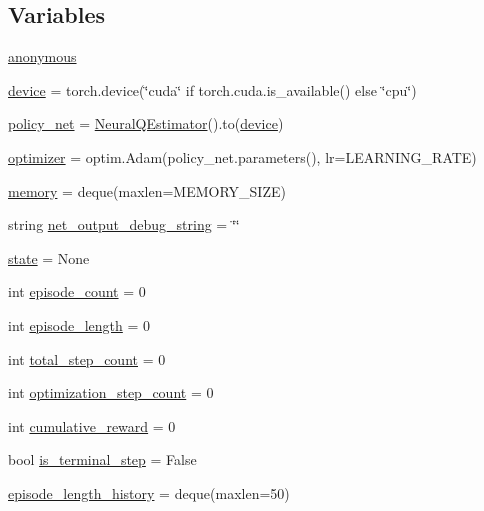 \subsection*{Variables}
\begin{DoxyCompactItemize}
\item 
\hyperlink{namespacelearn_a876436d14202fc09e5ca40af082209ca}{anonymous}
\item 
\hyperlink{namespacelearn_ae55deaa379fcb61fd26a801452c29737}{device} = torch.\+device(\char`\"{}cuda\char`\"{} if torch.\+cuda.\+is\+\_\+available() else \char`\"{}cpu\char`\"{})
\item 
\hyperlink{namespacelearn_aff1270198d684f1b88420d8ecbf660f0}{policy\+\_\+net} = \hyperlink{classparameters_1_1_neural_q_estimator}{Neural\+Q\+Estimator}().to(\hyperlink{namespacelearn_ae55deaa379fcb61fd26a801452c29737}{device})
\item 
\hyperlink{namespacelearn_ac338ecc10d74abd2f4882f19a6305c67}{optimizer} = optim.\+Adam(policy\+\_\+net.\+parameters(), lr=L\+E\+A\+R\+N\+I\+N\+G\+\_\+\+R\+A\+TE)
\item 
\hyperlink{namespacelearn_ab19d2fd92231ad109b1bee73faa22b3f}{memory} = deque(maxlen=M\+E\+M\+O\+R\+Y\+\_\+\+S\+I\+ZE)
\item 
string \hyperlink{namespacelearn_a2cfc8cc1bdb6765aba4bd1de7af92885}{net\+\_\+output\+\_\+debug\+\_\+string} = \char`\"{}\char`\"{}
\item 
\hyperlink{namespacelearn_a48d8007f4bd73948e2b7683cd736edfc}{state} = None
\item 
int \hyperlink{namespacelearn_a789e811e8744ef36689cd7a37bd5aeb2}{episode\+\_\+count} = 0
\item 
int \hyperlink{namespacelearn_ae4490c7a6bca1f4587c5a4f662e1dcc8}{episode\+\_\+length} = 0
\item 
int \hyperlink{namespacelearn_a3e9002d722506447b145dcdf6fdc3abe}{total\+\_\+step\+\_\+count} = 0
\item 
int \hyperlink{namespacelearn_af7c116c0d6b60453699825c2f7c17696}{optimization\+\_\+step\+\_\+count} = 0
\item 
int \hyperlink{namespacelearn_ab5c577e91e23a790a4813443943e0be3}{cumulative\+\_\+reward} = 0
\item 
bool \hyperlink{namespacelearn_a281a04971ff2288564c37fcf2a144453}{is\+\_\+terminal\+\_\+step} = False
\item 
\hyperlink{namespacelearn_ab297229048af5d469452446449da2c3f}{episode\+\_\+length\+\_\+history} = deque(maxlen=50)
\item 

\end{DoxyCompactItemize}
